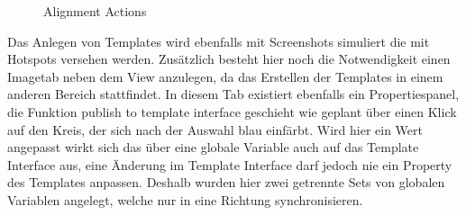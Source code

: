 \begin{figure}%
\centering
{}%
\qquad
{}%

\caption{Alignment Actions}%
\label{fig:Prototyp_06}
\end{figure}

Das Anlegen von Templates wird ebenfalls mit Screenshots simuliert die mit Hotspots versehen werden.
Zusätzlich besteht hier noch die Notwendigkeit einen Imagetab neben dem View anzulegen, da das Erstellen der Templates in einem anderen Bereich stattfindet.
In diesem Tab existiert ebenfalls ein Propertiespanel, die Funktion \glqq publish to template interface\grqq{} geschieht wie geplant über einen Klick auf den Kreis, der sich nach der Auswahl blau einfärbt.
Wird hier ein Wert angepasst wirkt sich das über eine globale Variable auch auf das Template Interface aus, eine Änderung im Template Interface darf jedoch nie ein Property des Templates anpassen.
Deshalb wurden hier zwei getrennte Sets von globalen Variablen angelegt, welche nur in eine Richtung synchronisieren.

